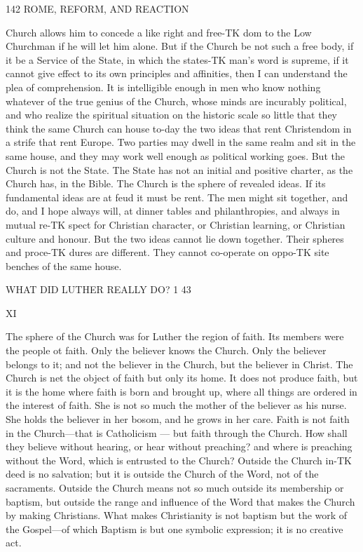 \documentclass[12pt,a5paper,oneside]{book}
\begin{document}
{142 ROME, REFORM, AND REACTION 

Church allows him to concede a like right and free-TK
dom to the Low Churchman if he will let him alone. 
But if the Church be not such a free body, if it 
be a Service of the State, in which the states-TK
man's word is supreme, if it cannot give effect to its 
own principles and affinities, then I can understand 
the plea of comprehension. It is intelligible enough 
in men who know nothing whatever of the true 
genius of the Church, whose minds are incurably 
political, and who realize the spiritual situation on 
the historic scale so little that they think the same 
Church can house to-day the two ideas that rent 
Christendom in a strife that rent Europe. Two 
parties may dwell in the same realm and sit in the 
same house, and they may work well enough as 
political working goes. But the Church is not the 
State. The State has not an initial and positive 
charter, as the Church has, in the Bible. The Church 
is the sphere of revealed ideas. If its fundamental 
ideas are at feud it must be rent. The men might 
sit together, and do, and I hope always will, at dinner 
tables and philanthropies, and always in mutual re-TK
spect for Christian character, or Christian learning, 
or Christian culture and honour. But the two ideas 
cannot lie down together. Their spheres and proce-TK
dures are different. They cannot co-operate on oppo-TK
site benches of the same house. 



WHAT DID LUTHER REALLY DO? 1 43 

XI 

The sphere of the Church was for Luther the 
region of faith. Its members were the people ot 
faith. Only the believer knows the Church. Only 
the believer belongs to it; and not the believer in 
the Church, but the believer in Christ. The Church 
is net the object of faith but only its home. It 
does not produce faith, but it is the home where 
faith is born and brought up, where all things are 
ordered in the interest of faith. She is not so much 
the mother of the believer as his nurse. She holds 
the believer in her bosom, and he grows in her care. 
Faith is not faith in the Church---that is Catholicism 
— but faith through the Church. How shall they 
believe without hearing, or hear without preaching? 
and where is preaching without the Word, which is 
entrusted to the Church? Outside the Church in-TK
deed is no salvation; but it is outside the Church 
of the Word, not of the sacraments. Outside the 
Church means not so much outside its membership 
or baptism, but outside the range and influence of the 
Word that makes the Church by making Christians. 
What makes Christianity is not baptism but the work 
of the Gospel---of which Baptism is but one symbolic 
expression; it is no creative act. 

}
\end{document}
